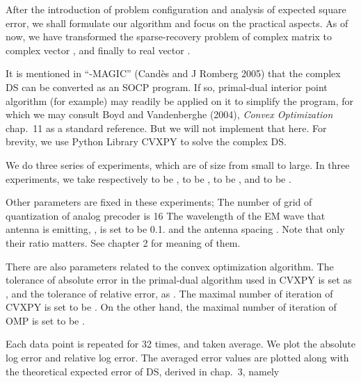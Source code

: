 \startchapter [title={Simulation}]

After the introduction of problem configuration and analysis of expected square error, we shall formulate our algorithm and focus on the practical aspects.
As of now, we have transformed the sparse-recovery problem of complex matrix  to complex vector , and finally to real vector .

It is mentioned in ``-MAGIC'' (Cand\`es and J Romberg 2005) that the complex DS can be converted as an SOCP program.
If so, primal-dual interior point algorithm (for example) may readily be applied on it to simplify the program, for which we may consult Boyd and Vandenberghe (2004), {\it Convex Optimization} chap.\ 11 as a standard reference.
But we will not implement that here.
For brevity, we use Python Library CVXPY to solve the complex DS.


\startsection [title={Parameters}]

We do three series of experiments, which are of size from small to large.
In three experiments, we take respectively  to be ,  to be ,  to be , and  to be .

Other parameters are fixed in these experiments; 
The number of grid of quantization of analog precoder is 16
The wavelength of the EM wave that antenna is emitting, , is set to be 0.1.
and the antenna spacing .
Note that only their ratio matters.
See chapter 2 for meaning of them.

There are also parameters related to the convex optimization algorithm.
The tolerance of absolute error in the primal-dual algorithm used in CVXPY is set as , and the tolerance of relative error, as .
The maximal number of iteration of CVXPY is set to be .
On the other hand, the maximal number of iteration of OMP is set to be .

Each data point is repeated for 32 times, and taken average.
We plot the absolute log error
and relative log error.
The averaged error values are plotted along with the theoretical expected error of DS, derived in chap.\ 3, namely


